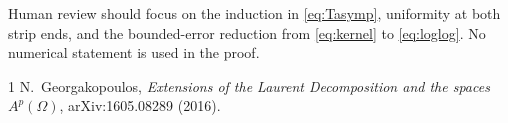 \documentclass[11pt]{article}
\begin{document}
Human review should focus on the induction in \eqref{eq:Tasymp}, uniformity at
both strip ends, and the bounded-error reduction from \eqref{eq:kernel} to
\eqref{eq:loglog}.  No numerical statement is used in the proof.

\enlargethispage{4\baselineskip}
\begin{thebibliography}{1}
N.~Georgakopoulos,
\emph{Extensions of the Laurent Decomposition and the spaces $A^p(\Omega)$},
arXiv:1605.08289 (2016).
\end{thebibliography}
\end{document}
